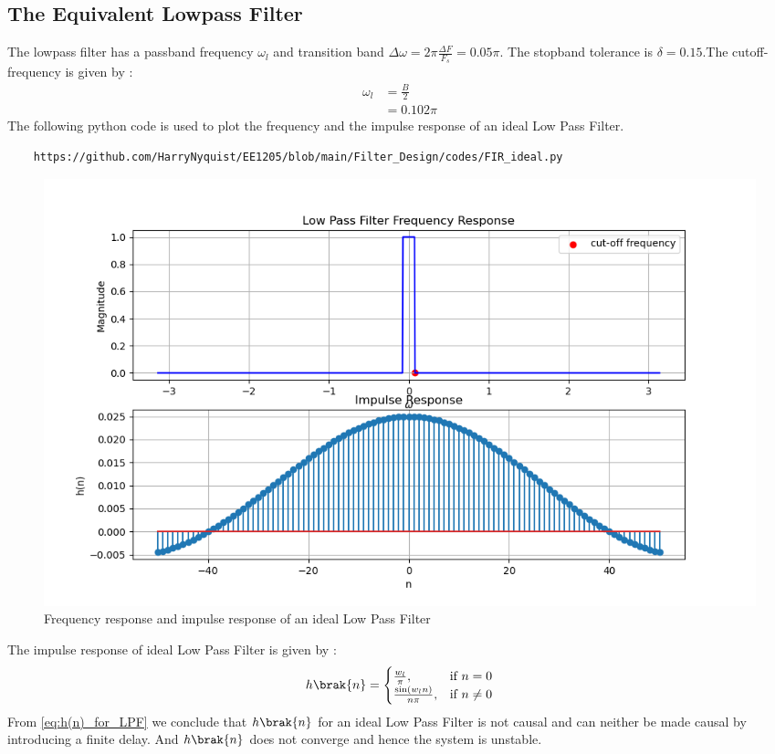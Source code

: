 \documentclass{article}
\begin{document}
\subsection{The Equivalent Lowpass Filter}
The lowpass filter has a passband frequency $\omega_l$ and transition band $\Delta \omega = 2\pi \frac{\Delta F}{F_s} = 0.05\pi$.
The stopband tolerance is $\delta=0.15$.The cutoff-frequency is given by :
\begin{align}
    \omega_{l} &= \frac{B}{2}\\
                &= 0.102\pi
\end{align}
The following python code is used to plot the frequency and the impulse response of an ideal Low Pass Filter.
\begin{lstlisting}
    https://github.com/HarryNyquist/EE1205/blob/main/Filter_Design/codes/FIR_ideal.py
\end{lstlisting}
\begin{figure}[H]
\centering
\includegraphics[width=1\columnwidth]{figs/LPF_FIR.png}
\caption{Frequency response and impulse response of an ideal Low Pass Filter}
\label{fig:LPF_FIR_1}
\end{figure}

The impulse response of ideal Low Pass Filter is given by :
\begin{align}
    h\brak{n} = 
\begin{cases} 
    \frac{w_l}{\pi}, & \text{if } n = 0 \\
    \frac{\sin(w_l n)}{n\pi}, & \text{if } n \neq 0
\end{cases} \label{eq:h(n)_for_LPF}
\end{align}
From \eqref{eq:h(n)_for_LPF} we conclude that $h\brak{n}$ for an ideal Low Pass Filter is not causal and can neither be made causal by introducing a finite delay. And $h\brak{n}$ does not converge and hence the system is unstable.
\end{document}
